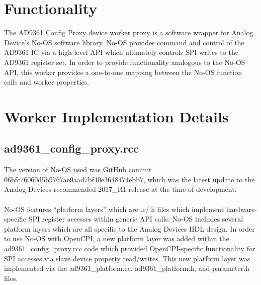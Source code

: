 \documentclass{article}
\def\comp{ad9361\_config\_proxy}
\def\Comp{AD9361 Config Proxy}
\begin{document}
\section*{Functionality}
	The \Comp{} device worker proxy is a software wrapper for Analog Device's No-OS software library\cite{no_os}. No-OS provides command and control of the AD9361 IC\cite{ad9361} via a high-level API which ultimately controls SPI writes to the AD9361 register set. In order to provide functionality analogous to the No-OS API, this worker provides a one-to-one mapping between the No-OS function calls and worker properties.
\section*{Worker Implementation Details}
\subsection*{\comp.rcc}
The version of No-OS used was GitHub commit 06bfc76060d5b9767ae9aad7bf40e3648474ebb7\cite{no_os_06bfc76060d5b9767ae9aad7bf40e3648474ebb7}, which was the latest update to the Analog Devices-recommended 2017\_R1 release at the time of development. \\ \\
No-OS features ``platform layers'' which are .c/.h files which implement hardware-specific SPI register accesses within generic API calls. No-OS includes several platform layers which are all specific to the Analog Devices HDL design\cite{adi_hdl_github}. In order to use No-OS with OpenCPI, a new platform layer was added within the \comp{}.rcc code which provided OpenCPI-specific functionality for SPI accesses via slave device property read/writes. This new platform layer was implemented via the ad9361\_platform.cc, ad9361\_platform.h, and parameter.h files. \\
\end{document}
